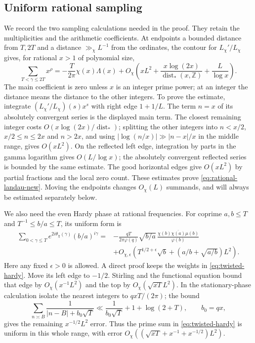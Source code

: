 \subsection{Uniform rational sampling}
We record the two sampling calculations needed in the proof. They
retain the multiplicities and the arithmetic coefficients.
At endpoints a bounded distance from $T,2T$ and a distance
$\gg_\chi L^{-1}$ from the ordinates, the contour for $L_\chi'/L_\chi$
gives, for rational $x>1$ of polynomial size,
\begin{equation}\label{eq:rational-landau-new}
 \sum_{T<\gamma\le2T}x^\rho
 =-\frac T{2\pi}\chi(x)\Lambda(x)
 +O_\chi\left(xL^2+
       \frac{x\log(2x)}{\operatorname{dist}_*(x,\mathbb Z)}
       +\frac L{\log x}\right).
\end{equation}
The main coefficient is zero unless $x$ is an integer prime power;
at an integer the distance means the distance to the other integers.
To prove the estimate, integrate $(L_\chi'/L_\chi)(s)x^s$ with right
edge $1+1/L$. The term $n=x$ of its absolutely convergent series is
the displayed main term. The closest remaining integer costs
$O(x\log(2x)/\operatorname{dist}_*)$; splitting the other integers
into $n<x/2$, $x/2\le n\le2x$ and $n>2x$, and using
$|\log(n/x)|\gg |n-x|/x$ in the middle range, gives $O(xL^2)$.
On the reflected left edge, integration by parts in the gamma
logarithm gives $O(L/\log x)$; the absolutely convergent reflected
series is bounded by the same estimate. The good horizontal edges
give $O(xL^2)$ by partial fractions and the local zero count.
These estimates prove \eqref{eq:rational-landau-new}. Moving the
endpoints changes $O_\chi(L)$ summands, and will always be estimated
separately below.

We also need the even Hardy phase at rational frequencies. For coprime
$a,b\le T$ and $T^{-1}\le b/a\le T$, its uniform form is
\begin{align}\label{eq:rational-phase-new}
 \sum_{0<\gamma\le T}e^{2i\theta_\chi(\gamma)}(b/a)^{i\gamma}
 ={}&-\frac{qT}{2\pi\varphi(q)}\sqrt{b/a}\,
       \frac{\chi(b)\overline{\chi(a)}\mu(b)}{\varphi(b)}\nonumber\\
 &+O_{\chi,\epsilon}\left(T^{1/2+\epsilon}\sqrt b+
                         (a/b+\sqrt{a/b})L^2\right).
\end{align}
Here any fixed $\epsilon>0$ is allowed. A direct proof keeps the
weights in \eqref{eq:twisted-hardy}. Move its left edge to $-1/2$.
Stirling and the functional equation bound that edge by
$O_\chi(x^{-1}L^2)$ and the top by $O_\chi(\sqrt{xT}L^2)$.
In the stationary-phase calculation isolate the nearest integers to
$qxT/(2\pi)$; the bound
\[
 \sum_{n\asymp B}\frac1{|n-B|+b_0\sqrt T}
 \ll\frac1{b_0\sqrt T}+1+\log(2+T),\qquad b_0=qx,
\]
gives the remaining $x^{-1/2}L^2$ error. Thus the prime sum in
\eqref{eq:twisted-hardy} is uniform in this whole range, with error
$O_\chi((\sqrt{xT}+x^{-1}+x^{-1/2})L^2)$.

